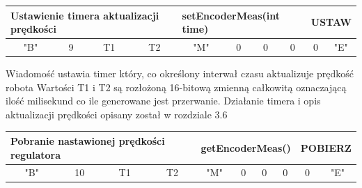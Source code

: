 \documentclass[eng,printmode]{mgr}
\begin{document}
\begin{table}[!htb]
\centering
\begin{adjustbox}{width=1\textwidth}
\label{my-label}
\begin{tabular}{|c|c|c|c|c|c|c|c|c|c|}
\hline
\multicolumn{4}{|l|}{Ustawienie timera aktualizacji prędkości } & \multicolumn{4}{l|}{setEncoderMeas(int time)} & \multicolumn{2}{l|}{USTAW} \\ \hline
"B" \hspace{1em}             & 9\hspace{2em}              & T1\hspace{2em}              & T2\hspace{2em}         & "M"\hspace{2em}         & 0\hspace{2em}         & 0\hspace{2em}         & 0\hspace{2em}         & 0\hspace{2em}          & "E"\hspace{2em}          \\ \hline
\end{tabular}
\end{adjustbox}
\end{table}

Wiadomość ustawia timer który, co określony interwał czasu aktualizuje prędkość robota
Wartości T1 i T2 są rozłożoną 16-bitową zmienną całkowitą oznaczającą ilość milisekund co ile generowane jest przerwanie.
Działanie timera i opis aktualizacji prędkości opisany został w rozdziale 3.6

\begin{table}[!htb]
\centering
\begin{adjustbox}{width=1\textwidth}
\label{my-label}
\begin{tabular}{|c|c|c|c|c|c|c|c|c|c|}
\hline
\multicolumn{4}{|l|}{Pobranie nastawionej prędkości regulatora   } & \multicolumn{4}{l|}{getEncoderMeas()} & \multicolumn{2}{l|}{POBIERZ} \\ \hline
"B" \hspace{1em}             & 10\hspace{2em}              & T1\hspace{2em}              & T2\hspace{2em}         & "M"\hspace{2em}         & 0\hspace{2em}         & 0\hspace{2em}         & 0\hspace{2em}         & 0\hspace{2em}          & "E"\hspace{2em}          \\ \hline
\end{tabular}
\end{adjustbox}
\end{table}
\end{document}

